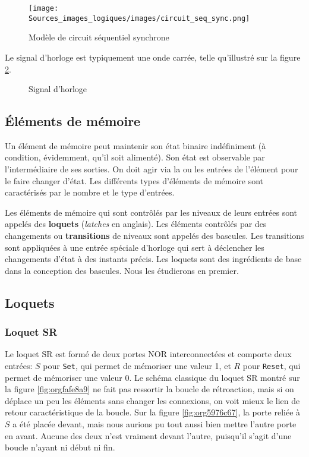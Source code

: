 \documentclass[11pt]{article}
\begin{document}
\begin{figure}[htbp]
\centering
\texttt{[image: Sources\_images\_logiques/images/circuit\_seq\_sync.png]}
\caption{\label{fig:orgcec16a3}Modèle de circuit séquentiel synchrone}
\end{figure}

Le signal d'horloge est typiquement une onde carrée, telle
qu'illustré sur la figure \ref{fig:orgbe9dc00}.

\begin{figure}[htbp]
\centering

\caption{\label{fig:orgbe9dc00}Signal d'horloge}
\end{figure}

\subsection{Éléments de mémoire}
\label{sec:org198cedb}

Un élément de mémoire peut maintenir son état binaire indéfiniment (à
condition, évidemment, qu'il soit alimenté). Son état est observable
par l'intermédiaire de ses sorties. On doit agir via la ou les entrées
de l'élément pour le faire changer d'état. Les différents types
d'éléments de mémoire sont caractérisés par le nombre et le type
d'entrées.

Les éléments de mémoire qui sont contrôlés par les niveaux de leurs
entrées sont appelés des \textbf{loquets} (\emph{latches} en anglais). Les
éléments contrôlés par des changements ou \textbf{transitions} de niveaux
sont appelés des bascules. Les transitions sont appliquées à une
entrée spéciale d'horloge qui sert à déclencher les changements d'état
à des instants précis. Les loquets sont des ingrédients de base dans
la conception des bascules. Nous les étudierons en premier.

\subsection{Loquets}
\label{sec:org70c624f}

\subsubsection{Loquet SR}
\label{sec:org485815b}

Le loquet SR est formé de deux portes NOR interconnectées et comporte
deux entrées: \(S\) pour \texttt{Set}, qui permet de mémoriser une valeur 1,
et \(R\) pour \texttt{Reset}, qui permet de mémoriser une valeur 0. Le schéma
classique du loquet SR montré sur la figure \ref{fig:orgfafe8a9} ne fait pas
ressortir la boucle de rétroaction, mais si on déplace un peu les
éléments sans changer les connexions, on voit mieux le lien de retour
caractéristique de la boucle. Sur la figure \ref{fig:org5976c67}, la porte reliée
à \(S\) a été placée devant, mais nous aurions pu tout aussi bien
mettre l'autre porte en avant. Aucune des deux n'est vraiment devant
l'autre, puisqu'il s'agit d'une boucle n'ayant ni début ni fin.
\end{document}
